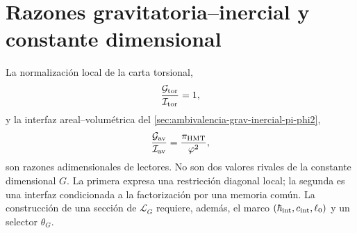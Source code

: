 \section{Razones gravitatoria--inercial y constante dimensional}
\label{sec:razones-no-rivales-G}

La normalización local de la carta torsional,
\[
 \frac{\mathcal G_{\rm tor}}{\mathcal I_{\rm tor}}=1,
\]
y la interfaz areal--volumétrica del
\cref{sec:ambivalencia-grav-inercial-pi-phi2},
\[
 \frac{\mathcal G_{\rm av}}{\mathcal I_{\rm av}}
 =\frac{\pi_{\rm HMT}}{\varphi^{2}},
\]
son razones adimensionales de lectores. No son dos valores rivales de la
constante dimensional \(G\). La primera expresa una restricción diagonal
local; la segunda es una interfaz condicionada a la factorización por una
memoria común. La construcción de una sección de
\(\mathcal L_G\) requiere, además, el marco
\((\hbar_{\rm int},c_{\rm int},\ell_0)\) y un selector
\(\theta_G\).
